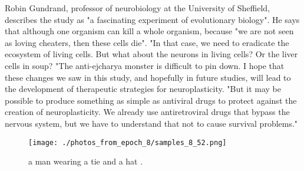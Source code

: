 \documentclass{article}%
\begin{document}
Robin Gundrand, professor of neurobiology at the University of Sheffield, describes the study as "a fascinating experiment of evolutionary biology".\newline%
He says that although one organism can kill a whole organism, because "we are not seen as loving cheaters, then these cells die".\newline%
"In that case, we need to eradicate the ecosystem of living cells. But what about the neurons in living cells? Or the liver cells in soup?\newline%
"The anti{-}ejcharya monster is difficult to pin down. I hope that these changes we saw in this study, and hopefully in future studies, will lead to the development of therapeutic strategies for neuroplasticity.\newline%
"But it may be possible to produce something as simple as antiviral drugs to protect against the creation of neuroplasticity. We already use antiretroviral drugs that bypass the nervous system, but we have to understand that not to cause survival problems."\newline%

%


\begin{figure}[h!]%
\centering%
\texttt{[image: ./photos\_from\_epoch\_8/samples\_8\_52.png]}%
\caption{a man wearing a tie and a hat .}%
\end{figure}

%
\end{document}

